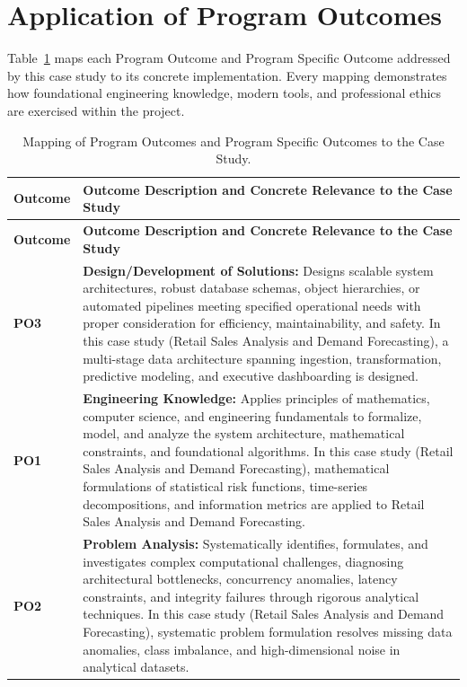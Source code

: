 \section{Application of Program Outcomes}
Table~\ref{tab:po} maps each Program Outcome and Program Specific Outcome addressed by this case study to its concrete implementation. Every mapping demonstrates how foundational engineering knowledge, modern tools, and professional ethics are exercised within the project.

{\small
\begin{longtable}{@{}>{\centering\arraybackslash}p{1.8cm} p{13.2cm}@{}}
    \caption{Mapping of Program Outcomes and Program Specific Outcomes to the Case Study.}\label{tab:po}\\
    \toprule
    \textbf{Outcome} & \textbf{Outcome Description and Concrete Relevance to the Case Study} \\
    \midrule
    \endfirsthead
    \toprule
    \textbf{Outcome} & \textbf{Outcome Description and Concrete Relevance to the Case Study} \\
    \midrule
    \endhead
\textbf{PO3} & \textbf{Design/Development of Solutions:} Designs scalable system architectures, robust database schemas, object hierarchies, or automated pipelines meeting specified operational needs with proper consideration for efficiency, maintainability, and safety. In this case study (Retail Sales Analysis and Demand Forecasting), a multi-stage data architecture spanning ingestion, transformation, predictive modeling, and executive dashboarding is designed. \\
    \addlinespace
\textbf{PO1} & \textbf{Engineering Knowledge:} Applies principles of mathematics, computer science, and engineering fundamentals to formalize, model, and analyze the system architecture, mathematical constraints, and foundational algorithms. In this case study (Retail Sales Analysis and Demand Forecasting), mathematical formulations of statistical risk functions, time-series decompositions, and information metrics are applied to Retail Sales Analysis and Demand Forecasting. \\
    \addlinespace
\textbf{PO2} & \textbf{Problem Analysis:} Systematically identifies, formulates, and investigates complex computational challenges, diagnosing architectural bottlenecks, concurrency anomalies, latency constraints, and integrity failures through rigorous analytical techniques. In this case study (Retail Sales Analysis and Demand Forecasting), systematic problem formulation resolves missing data anomalies, class imbalance, and high-dimensional noise in analytical datasets. \\

\end{longtable}}
